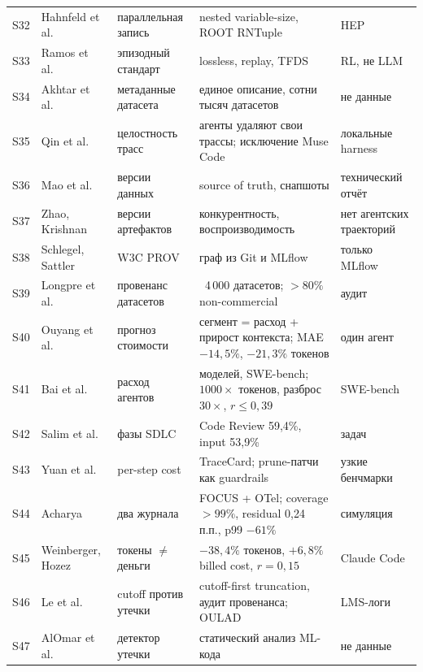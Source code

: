 \documentclass[11pt,a4paper]{article}
\begin{document}
{\begin{longtable}{@{}>{\raggedright\arraybackslash}p{0.55cm}>{\raggedright\arraybackslash}p{3.0cm}>{\raggedright\arraybackslash}p{2.7cm}>{\raggedright\arraybackslash}p{4.3cm}>{\raggedright\arraybackslash}p{3.0cm}@{}}
S32 & Hahnfeld et al.~\cite{hahnfeld2024nested} & параллельная запись & nested variable-size, ROOT RNTuple & HEP \\
S33 & Ramos et al.~\cite{ramos2021rlds} & эпизодный стандарт & lossless, replay, TFDS & RL, не LLM \\
S34 & Akhtar et al.~\cite{akhtar2024croissant} & метаданные датасета & единое описание, сотни тысяч датасетов & не данные \\
S35 & Qin et al.~\cite{qin2026tamper} & целостность трасс & агенты удаляют свои трассы; исключение Muse Code & локальные harness \\
S36 & Mao et al.~\cite{mao2023datasetmgmt} & версии данных & source of truth, снапшоты & технический отчёт \\
S37 & Zhao, Krishnan~\cite{zhao2025tablevault} & версии артефактов & конкурентность, воспроизводимость & нет агентских траекторий \\
S38 & Schlegel, Sattler~\cite{schlegel2023mlflow2prov} & W3C PROV & граф из Git и MLflow & только MLflow \\
S39 & Longpre et al.~\cite{longpre2024provenance} & провенанс датасетов & ~4\,000 датасетов; $>80\%$ non-commercial & аудит \\
S40 & Ouyang et al.~\cite{ouyang2026tokencast} & прогноз стоимости & сегмент = расход + прирост контекста; MAE $-14{,}5\%$, $-21{,}3\%$ токенов & один агент \\
S41 & Bai et al.~\cite{bai2026money} & расход агентов & 8 моделей, SWE-bench; $1000\times$ токенов, разброс $30\times$, $r\le0{,}39$ & SWE-bench \\
S42 & Salim et al.~\cite{salim2026tokenomics} & фазы SDLC & Code Review 59,4\%, input 53,9\% & 30 задач \\
S43 & Yuan et al.~\cite{yuan2026clawtrace} & per-step cost & TraceCard; prune-патчи как guardrails & узкие бенчмарки \\
S44 & Acharya~\cite{acharya2026twoledger} & два журнала & FOCUS + OTel; coverage $>99\%$, residual 0,24 п.п., p99 $-61\%$ & симуляция \\
S45 & Weinberger, Hozez~\cite{weinberger2026tokenreduction} & токены $\ne$ деньги & $-38{,}4\%$ токенов, $+6{,}8\%$ billed cost, $r=0{,}15$ & Claude Code \\
S46 & Le et al.~\cite{le2026leap} & cutoff против утечки & cutoff-first truncation, аудит провенанса; OULAD & LMS-логи \\
S47 & AlOmar et al.~\cite{alomar2025leakagedetector} & детектор утечки & статический анализ ML-кода & не данные \\

\end{longtable}}
\end{document}
